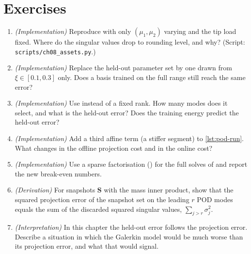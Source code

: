 \section*{Exercises}\label{sec:pod-exercises}
\begin{enumerate}
\item \emph{(Implementation)} Reproduce  with only $(\mu_1,\mu_2)$ varying and the tip load fixed. Where do the singular values drop to rounding level, and why? (Script: \texttt{scripts/ch08\_assets.py}.)
\item \emph{(Implementation)} Replace the held-out parameter set by one drawn from $\xi\in[0.1,0.3]$ only. Does a basis trained on the full range still reach the same error?
\item \emph{(Implementation)} Use  instead of a fixed rank. How many modes does it select, and what is the held-out error? Does the training energy predict the held-out error?
\item \emph{(Implementation)} Add a third affine term (a stiffer segment) to \cref{lst:pod-run}. What changes in the offline projection cost and in the online cost?
\item \emph{(Implementation)} Use a sparse factorisation () for the full solves of  and report the new break-even numbers.
\item \emph{(Derivation)} For snapshots $\bm S$ with the mass inner product, show that the squared projection error of the snapshot set on the leading $r$ POD modes equals the sum of the discarded squared singular values, $\sum_{j>r}\sigma_j^2$.
\item \emph{(Interpretation)} In this chapter the held-out error follows the projection error. Describe a situation in which the Galerkin model would be much worse than its projection error, and what that would signal.
\end{enumerate}

\chapterrefs
